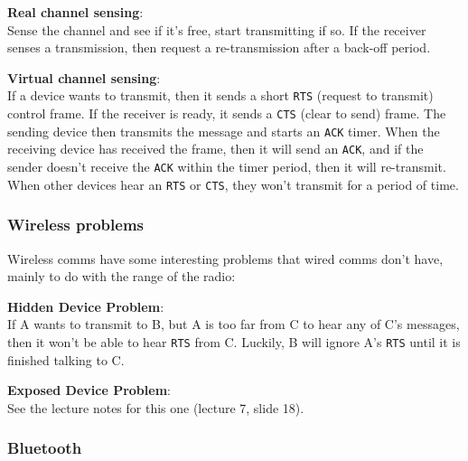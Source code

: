 \begin{description}
  \item \textbf{Real channel sensing}:\\
    Sense the channel and see if it's free, start transmitting if so. If the
    receiver senses a transmission, then request a re-transmission after a 
    back-off period.
  \item \textbf{Virtual channel sensing}:\\
    If a device wants to transmit, then it sends a short \texttt{RTS} (request
    to transmit) control frame. If the receiver is ready, it sends a
    \texttt{CTS} (clear to send) frame. The sending device then transmits the 
    message and starts an \texttt{ACK} timer. When the receiving device has
    received the frame, then it will send an \texttt{ACK}, and if the sender
    doesn't receive the \texttt{ACK} within the timer period, then it will
    re-transmit. When other devices hear an \texttt{RTS} or \texttt{CTS}, they
    won't transmit for a period of time.
\end{description}

\subsubsection{Wireless problems}

Wireless comms have some interesting problems that wired comms don't have,
mainly to do with the range of the radio:

\begin{description}
  \item \textbf{Hidden Device Problem}:\\
    If A wants to transmit to B, but A is too far from C to hear any of C's
    messages, then it won't be able to hear \texttt{RTS} from C. Luckily, B
    will ignore A's \texttt{RTS} until it is finished talking to C.
  \item \textbf{Exposed Device Problem}:\\
    See the lecture notes for this one (lecture 7, slide 18).
\end{description}

\subsubsection{Bluetooth}

